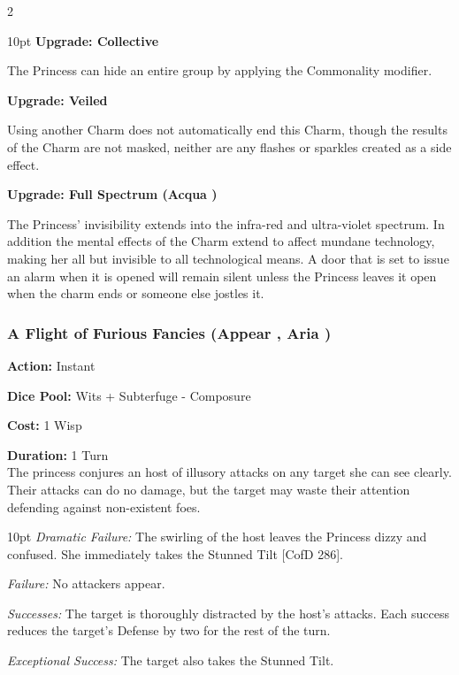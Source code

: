 \begin{multicols}{2}
\begin{myindentpar}{10pt}
\textbf{Upgrade: Collective}

The Princess can hide an entire group by applying the Commonality modifier. 

\textbf{Upgrade: Veiled}

Using another Charm does not automatically end this Charm, though the results of the Charm are not masked, neither are any flashes or sparkles created as a side effect.

\textbf{Upgrade: Full Spectrum (Acqua \textbullet\textbullet)}

The Princess' invisibility extends into the infra-red and ultra-violet spectrum. In addition the mental effects of the Charm extend to affect mundane technology, making her all but invisible to all technological means. A door that is set to issue an alarm when it is opened will remain silent unless the Princess leaves it open when the charm ends or someone else jostles it. 
\end{myindentpar}

\subsubsection*{A Flight of Furious Fancies (Appear \textbullet\textbullet\textbullet, Aria \textbullet\textbullet\textbullet)}

\noindent \textbf{Action:} Instant

\noindent \textbf{Dice Pool:} Wits + Subterfuge - Composure

\noindent \textbf{Cost:} 1 Wisp

\noindent \textbf{Duration:} 1 Turn\\

\noindent The princess conjures an host of illusory attacks on any target she can see clearly. Their attacks can do no damage, but the target may waste their attention defending against non-existent foes.

\begin{myindentpar}{10pt}     \emph{Dramatic Failure:} The swirling of the host leaves the Princess dizzy and confused. She immediately takes the Stunned Tilt [CofD 286].

    \emph{Failure:} No attackers appear.

    \emph{Successes:}  The target is thoroughly distracted by the host’s attacks. Each success reduces the target's Defense by two for the rest of the turn.

    \emph{Exceptional Success:} The target also takes the Stunned Tilt. \end{myindentpar}



\end{multicols}
